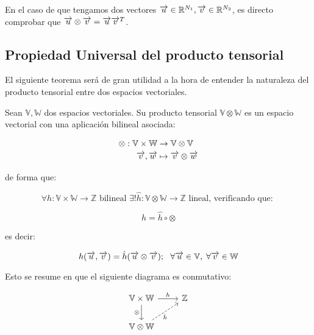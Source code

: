 \begin{observacion}
	En el caso de que tengamos dos vectores $\overrightarrow{u} \in \mathbb{R}^{N_1}, \overrightarrow{v} \in \mathbb{R}^{N_2}$, es directo comprobar que $\overrightarrow{u} \otimes \overrightarrow{v} = \overrightarrow{u} \overrightarrow{v}^T$.
\end{observacion}


\subsection{Propiedad Universal del producto tensorial}

El siguiente teorema será de gran utilidad a la hora de entender la naturaleza del producto tensorial entre dos espacios vectoriales.

\begin{teorema} Sean $\mathbb{V}, \mathbb{W}$ dos espacios vectoriales. Su producto tensorial $\mathbb{V} \otimes \mathbb{W}$ es un espacio vectorial con una aplicación bilineal asociada:

	\begin{equation}
		\begin{split}
			\otimes : \mathbb{V} \times \mathbb{W} &\to \mathbb{V} \otimes \mathbb{V} \\
			\overrightarrow{v}, \overrightarrow{w} & \mapsto \overrightarrow{v} \otimes \overrightarrow{w}
		\end{split}
	\end{equation}

	de forma que:

	\begin{equation}
		\forall h: \mathbb{V} \times \mathbb{W} \to \mathbb{Z} \text{  bilineal  } \exists! \hat{h}: \mathbb{V} \otimes \mathbb{W} \to \mathbb{Z} \text{  lineal, verificando que: }
	\end{equation}

	\begin{equation}
		h = \hat{h} \circ \otimes
	\end{equation}

	es decir:

	\begin{equation}
		h(\overrightarrow{u}, \overrightarrow{v}) = \hat{h}(\overrightarrow{u} \otimes \overrightarrow{v});
		\ \  \forall \overrightarrow{u} \in \mathbb{V}, \; \forall \overrightarrow{v} \in \mathbb{W}
	\end{equation}

	Esto se resume en que el siguiente diagrama es conmutativo:

	\begin{equation}
		\begin{tikzcd}
			\mathbb{V} \times \mathbb{W} \ar{r}{h} \ar{d}[left]{\otimes} & \mathbb{Z} \\
			\mathbb{V} \otimes \mathbb{W} \ar[dashed]{ur}[right, below]{\hat{h}}
		\end{tikzcd}
	\end{equation}

\end{teorema}

